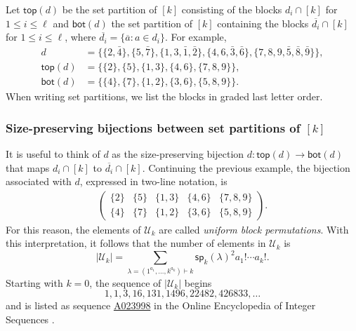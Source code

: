 \documentclass[10pt]{amsart}
\theoremstyle{definition}
\theoremstyle{remark}
\newcommand{\defncolor}{\color{darkred}}
\newcommand{\defn}[1]{{\defncolor\emph{#1}}} %
\begin{document}
Let $\mathsf{top}(d)$ be the set partition of $[k]$ consisting of the blocks $d_i \cap [k]$
for $1 \leqslant i \leqslant \ell$ and $\mathsf{bot}(d)$ the set
partition of $[k]$ containing the blocks $\overline{d_i} \cap [k]$
for $1 \leqslant i \leqslant \ell$, where $\overline{d_i} = \{ \overline{a} : a \in d_i\}$. For example,
\begin{align*}
    d & = \{ \{2,\bar{4} \}, \{5,\bar{7} \}, \{1,3,\bar{1},\bar{2} \}, \{4,6,\bar{3}, \bar{6}\}, \{7, 8, 9, \bar{5}, \bar{8}, \bar{9} \}  \},\\
\mathsf{top}(d) &=\{\{2\}, \{5\}, \{ 1,3\},  \{4, 6\},  \{7, 8, 9\}\},\\
\mathsf{bot}(d) &=\{ \{ 4\}, \{7\},  \{1,2\},\{3,6\},  \{5, 8, 9\}\}.
\end{align*}
When writing set partitions, we list the blocks in graded last letter order.

\subsubsection{Size-preserving bijections between set partitions of $[k]$}
\label{sssection:bijection}
It is useful to think of $d$ as the size-preserving bijection $d \colon
\mathsf{top}(d) \rightarrow \mathsf{bot}(d)$ that maps
$d_i \cap [k]$ to $\overline{d_i} \cap [k]$.
Continuing the previous example, the bijection associated with $d$, expressed
in two-line notation, is
\begin{align*}
    \left(
        \begin{array}{ccccc}
            \{2\} & \{5\} & \{ 1,3\} & \{4, 6\} & \{7, 8, 9\}\\
            \{4\} & \{7\} & \{1,2\}  & \{3,6\}  & \{5, 8, 9\}
        \end{array}
    \right).
\end{align*}
For this reason, the elements of $\mathcal{U}_k$ are called \defn{uniform block
permutations}. With this interpretation, it follows that the number of elements
in $\mathcal{U}_k$ is
\[
     |\mathcal{U}_k| = \sum_{\lambda = (1^{a_1}, \ldots, k^{a_k})\vdash k} \mathsf{sp}_k(\lambda)^2 a_1! \cdots a_k!.
\]
Starting with $k=0$, the sequence of $ |\mathcal{U}_k|$ begins
\[
1, 1, 3, 16, 131, 1496, 22482, 426833,\ldots
\]
and is listed as sequence \href{https://oeis.org/A023998}{A023998}
in the Online Encyclopedia of Integer Sequences \cite{OEIS}.
\end{document}
